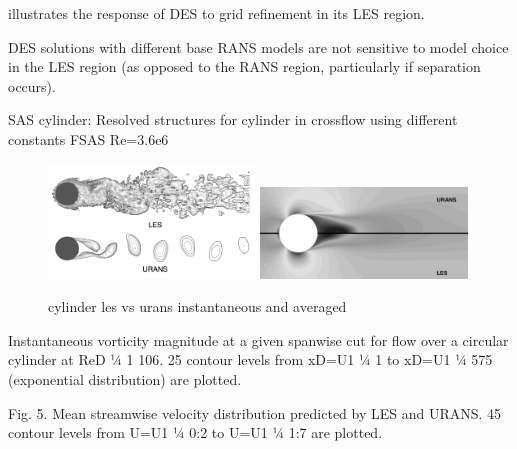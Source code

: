 \documentclass[journal]{new-aiaa}
\begin{document}
illustrates the response of DES to grid refinement in its LES region.

DES solutions with different base RANS models are not sensitive to
model choice in the LES region (as opposed to the RANS region, particularly if separation occurs).








SAS cylinder: Resolved structures for cylinder in crossflow using different constants FSAS Re=3.6e6






\begin{figure}[H]
\begin{center}
\includegraphics[width=0.49\textwidth]{Images/logan/catalano_2003numerical_UnsteadyURANSvsLES.pdf}
\includegraphics[width=0.49\textwidth]{Images/logan/catalano_2003numerical_SteadyURANSvsLES.pdf}
\caption{ cylinder les vs urans instantaneous and averaged \cite{catalano2003numerical} }
\label{fig:cylinderransvslesflow}
\end{center}
\end{figure}

Instantaneous vorticity magnitude at a given spanwise cut for flow over a circular cylinder at ReD 1⁄4 1   106. 25 contour levels from xD=U1 1⁄4 1 to xD=U1 1⁄4 575 (exponential distribution) are plotted.

Fig. 5. Mean streamwise velocity distribution predicted by LES and URANS. 45 contour levels from U=U1 1⁄4  0:2 to U=U1 1⁄4 1:7 are plotted.
\end{document}
